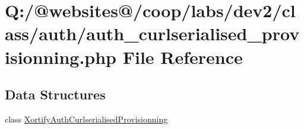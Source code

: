 \hypertarget{auth__curlserialised__provisionning_8php}{\section{Q\-:/@websites@/coop/labs/dev2/class/auth/auth\-\_\-curlserialised\-\_\-provisionning.php File Reference}
\label{auth__curlserialised__provisionning_8php}
}
\subsection*{Data Structures}
\begin{DoxyCompactItemize}
\item 
class \hyperlink{class_xortify_auth_curlserialised_provisionning}{Xortify\-Auth\-Curlserialised\-Provisionning}
\end{DoxyCompactItemize}
